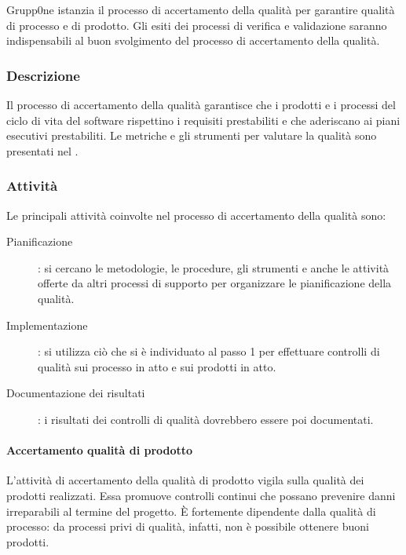 \documentclass[../norme-di-progetto.tex]{subfiles}
\begin{document}
Grupp0ne istanzia il processo di accertamento della qualità per garantire qualità di processo e di prodotto.
Gli esiti dei processi di verifica e validazione saranno indispensabili al buon svolgimento del processo di accertamento della qualità.

\subsubsection{Descrizione}%
\label{subs:accertamento della qualita/descrizione}

Il processo di accertamento della qualità garantisce che i prodotti e i processi del ciclo di vita del software rispettino i requisiti prestabiliti e che aderiscano ai piani esecutivi prestabiliti. Le metriche e gli strumenti per valutare la qualità sono presentati nel .

\subsubsection{Attività}%
\label{subs:attivita}

Le principali attività coinvolte nel processo di accertamento della qualità sono:

\begin{description}
  \item [Pianificazione]: si cercano le metodologie, le procedure, gli strumenti e anche le attività offerte da altri processi di supporto per organizzare le pianificazione della qualità.
  \item [Implementazione]: si utilizza ciò che si è individuato al passo 1 per effettuare controlli di qualità sui processo in atto e sui prodotti in atto.
  \item [Documentazione dei risultati]: i risultati dei controlli di qualità dovrebbero essere poi documentati.
\end{description}

\paragraph{Accertamento qualità di prodotto}%
\label{par:accertamento qualita di prodotto}
L'attività di accertamento della qualità di prodotto vigila sulla qualità dei prodotti realizzati. Essa promuove controlli continui che possano prevenire danni irreparabili al termine del progetto. È fortemente dipendente dalla qualità di processo: da processi privi di qualità, infatti, non è possibile ottenere buoni prodotti.
\end{document}
